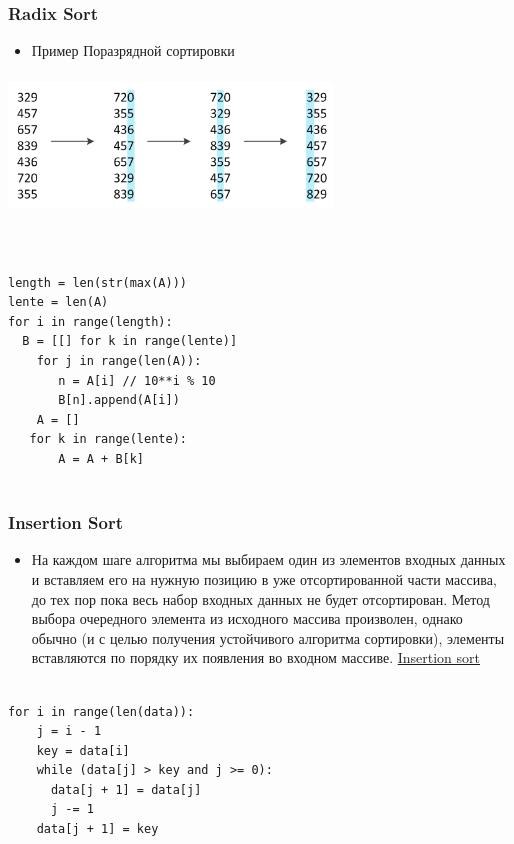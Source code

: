 \documentclass[t]{beamer}  %
\begin{document}
\begin{frame}[t]
	\frametitle{Radix Sort}
		\begin{itemize}
	\item Пример Поразрядной сортировки
		\end{itemize}
	\includegraphics[width=325px,height=140px]{sort2.png}
	
\end{frame}


\begin{lstlisting}[label=some-code,caption={Реализация на Python}]


length = len(str(max(A)))
lente = len(A)
for i in range(length):
  B = [[] for k in range(lente)]
    for j in range(len(A)):
       n = A[i] // 10**i % 10
       B[n].append(A[i])
    A = []
   for k in range(lente):
       A = A + B[k]


\end{lstlisting}


\begin{frame}[t]
	\frametitle{Insertion Sort}
	\begin{itemize}
		\pause 
		\item На каждом шаге алгоритма мы выбираем один из элементов входных данных и вставляем его на нужную позицию в уже отсортированной части массива, до тех пор пока весь набор входных данных не будет отсортирован. Метод выбора очередного элемента из исходного массива произволен, однако обычно (и с целью получения устойчивого алгоритма сортировки), элементы вставляются по порядку их появления во входном массиве. \pause
	   \href{images/gif3.gif}{Insertion sort}
	\end{itemize}
\end{frame}

\begin{lstlisting}[label=some-code,caption={Реализация на Python}]

for i in range(len(data)):
    j = i - 1 
    key = data[i]
    while (data[j] > key and j >= 0):
      data[j + 1] = data[j]
      j -= 1
    data[j + 1] = key

\end{lstlisting}
\end{document}

